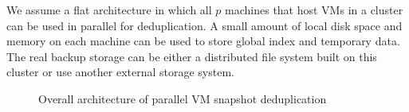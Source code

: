 \begin{itemize}

\end{itemize}


We assume a flat architecture in which  all $p$ machines that host VMs in a cluster can 
be used in parallel for deduplication. 
A small amount of local disk space and memory on each machine can be used 
to store global index and temporary data. 
The real backup storage can be either a distributed file system built on
this cluster  or use another  external storage system. 



\begin{figure}
\centering

\caption{Overall architecture of parallel VM snapshot deduplication}
\label{fig:snapshot}
\end{figure}

